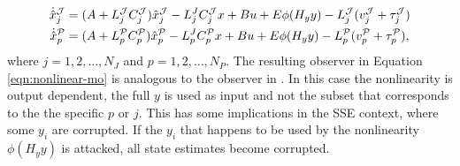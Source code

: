 \begin{equation}\label{eqn:nonlinear-mo}
    \begin{split}
        \dot{\hat{x}}_{j}^{\mathcal{J}} &= (A + L_{j}^{\mathcal{J}}C_{j}^{\mathcal{J}})\hat{x}^{\mathcal{J}}_{j} - L_{j}^JC_{j}^{\mathcal{J}}x + Bu + E\phi(H_{y}y) - L_{j}^{\mathcal{J}}(v_{j}^{\mathcal{J}} + \tau_{j}^{\mathcal{J}}) \\
        \dot{\hat{x}}_{p}^{\mathcal{P}} &= (A + L_{p}^{\mathcal{P}}C_{p}^{\mathcal{P}})\hat{x}^{\mathcal{P}}_{p} - L_{p}^JC_{p}^{\mathcal{P}}x + Bu + E\phi(H_{y}y) - L_{p}^{\mathcal{P}}(v_{p}^{\mathcal{P}} + \tau_{p}^{\mathcal{P}}),
    \end{split}
\end{equation}
where $j=1,2,\dots,N_J$ and $p=1,2,\dots,N_P$. The resulting observer in Equation \ref{eqn:nonlinear-mo} is analogous to the observer in \cite[Equation 5]{Chong2023MemoryAlgorithms}. In this case the nonlinearity is output dependent, the full $y$ is used as input and not the subset that corresponds to the the specific $p$ or $j$. This has some implications in the SSE context, where some $y_i$ are corrupted. If the $y_i$ that happens to be used by the nonlinearity $\phi(H_yy)$ is attacked, all state estimates become corrupted.

